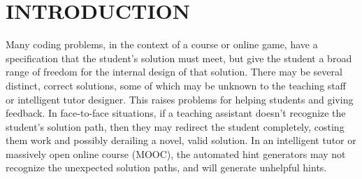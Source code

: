 \documentclass[12pt]{article}
\begin{document}
%

%



\section{INTRODUCTION}


Many coding problems, in the context of a course or online game, have a specification that the student's solution must meet, but give the student a broad range of freedom for the internal design of that solution. There may be several distinct, correct solutions, some of which may be unknown to the teaching staff or intelligent tutor designer. This raises problems for helping students and giving feedback. In face-to-face situations, if a teaching assistant doesn't recognize the student's solution path, then they may redirect the student completely, costing them work and possibly derailing a novel, valid solution. In an intelligent tutor or massively open online course (MOOC), the automated hint generators may not recognize the unexpected solution paths, and will generate unhelpful hints.
\end{document}
